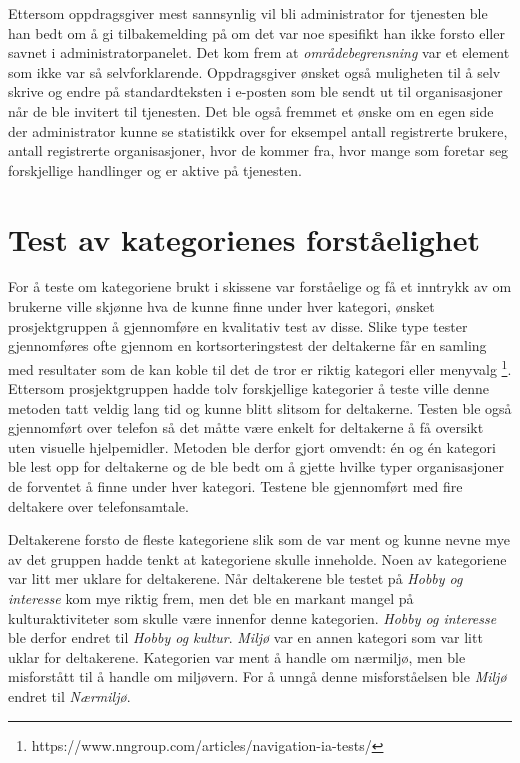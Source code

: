 Ettersom oppdragsgiver mest sannsynlig vil bli administrator for tjenesten ble han bedt om å gi tilbakemelding på om det var noe spesifikt han ikke forsto eller savnet i administratorpanelet. Det kom frem at {\em  områdebegrensning} var et element som ikke var så selvforklarende. Oppdragsgiver ønsket også muligheten til å selv skrive og endre på standardteksten i e-posten som ble sendt ut til organisasjoner når de ble invitert til tjenesten. Det ble også fremmet et ønske om en egen side der administrator kunne se statistikk over for eksempel antall registrerte brukere, antall registrerte organisasjoner, hvor de kommer fra, hvor mange som foretar seg forskjellige handlinger og er aktive på tjenesten.

\section{Test av kategorienes forståelighet}
For å teste om kategoriene brukt i skissene var forståelige og få et inntrykk av om brukerne ville skjønne hva de kunne finne under hver kategori, ønsket prosjektgruppen å gjennomføre en kvalitativ test av disse. Slike type tester gjennomføres ofte gjennom en kortsorteringstest der deltakerne får en samling med resultater som de kan koble til det de tror er riktig kategori eller menyvalg \footnote{https://www.nngroup.com/articles/navigation-ia-tests/}. Ettersom prosjektgruppen hadde tolv forskjellige kategorier å teste ville denne metoden tatt veldig lang tid og kunne blitt slitsom for deltakerne. Testen ble også gjennomført over telefon så det måtte være enkelt for deltakerne å få oversikt uten visuelle hjelpemidler. Metoden ble derfor gjort omvendt: én og én kategori ble lest opp for deltakerne og de ble bedt om å gjette hvilke typer organisasjoner de forventet å finne under hver kategori. Testene ble gjennomført med fire deltakere over telefonsamtale.

Deltakerene forsto de fleste kategoriene slik som de var ment og kunne nevne mye av det gruppen hadde tenkt at kategoriene skulle inneholde. Noen av kategoriene var litt mer uklare for deltakerene. Når deltakerene ble testet på {\em Hobby og interesse} kom mye riktig frem, men det ble en markant mangel på kulturaktiviteter som skulle være innenfor denne kategorien. {\em Hobby og interesse} ble derfor endret til {\em Hobby og kultur}. {\em Miljø} var en annen kategori som var litt uklar for deltakerene. Kategorien var ment å handle om nærmiljø, men ble misforstått til å handle om miljøvern. For å unngå denne misforståelsen ble {\em Miljø} endret til {\em Nærmiljø}.



